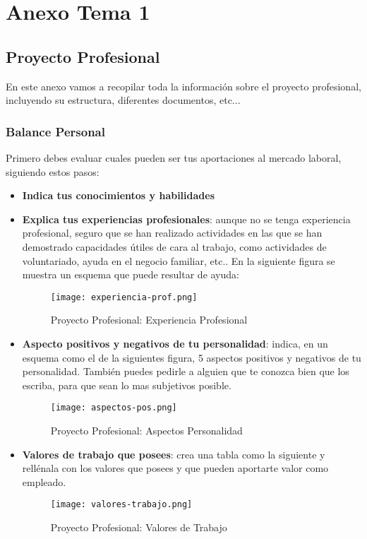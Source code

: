 \chapter{Anexo Tema 1}

\section{Proyecto Profesional}
En este anexo vamos a recopilar toda la información sobre el proyecto profesional, incluyendo su estructura, diferentes documentos, etc...

\subsection{Balance Personal}
Primero debes evaluar cuales pueden ser tus aportaciones al mercado laboral, siguiendo estos pasos:

\begin{itemize}
    \item \textbf{Indica tus conocimientos y habilidades}
    \item \textbf{Explica tus experiencias profesionales}: aunque no se tenga experiencia profesional, seguro que se han realizado actividades en las que se han demostrado capacidades útiles de cara al trabajo, como actividades de voluntariado, ayuda en el negocio familiar, etc.. En la siguiente figura se muestra un esquema que puede resultar de ayuda:

    \begin{figure}[ht]
        \centering
        \texttt{[image: experiencia-prof.png]}
        \caption{Proyecto Profesional: Experiencia Profesional}
    \end{figure}

    \item \textbf{Aspecto positivos y negativos de tu personalidad}: indica, en un esquema como el de la siguientes figura, 5 aspectos positivos y negativos de tu personalidad. También puedes pedirle a alguien que te conozca bien que los escriba, para que sean lo mas subjetivos posible.

    \begin{figure}[ht]
        \centering
        \texttt{[image: aspectos-pos.png]}
        \caption{Proyecto Profesional: Aspectos Personalidad}
    \end{figure}

    \item \textbf{Valores de trabajo que posees}: crea una tabla como la siguiente y rellénala con los valores que posees y que pueden aportarte valor como empleado.

    \begin{figure}[ht]
        \centering
        \texttt{[image: valores-trabajo.png]}
        \caption{Proyecto Profesional: Valores de Trabajo}
    \end{figure}
\end{itemize}

